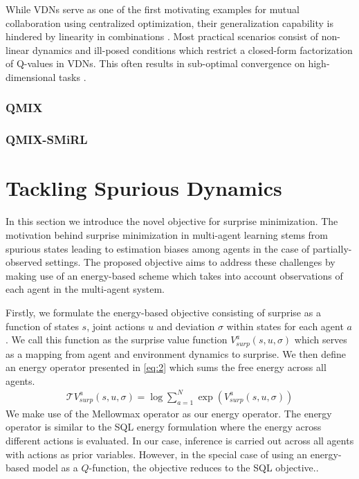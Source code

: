 \documentclass{article}
\begin{document}
\begin{multicols}{2}
While VDNs serve as one of the first motivating examples for mutual collaboration using centralized optimization, their generalization capability is hindered by linearity in combinations \cite{qmix}. Most practical scenarios consist of non-linear dynamics and ill-posed conditions which restrict a closed-form factorization of Q-values in VDNs. This often results in sub-optimal convergence on high-dimensional tasks \cite{qmix}.

\subsubsection{QMIX}

\subsubsection{QMIX-SMiRL}


\section{Tackling Spurious Dynamics}
In this section we introduce the novel objective for surprise minimization. The motivation behind surprise minimization in multi-agent learning stems from spurious states leading to estimation biases among agents in the case of partially-observed settings. The proposed objective aims to address these challenges by making use of an energy-based scheme which takes into account observations of each agent in the multi-agent system. 

Firstly, we formulate the energy-based objective consisting of surprise as a function of states $s$, joint actions $u$ and deviation $\sigma$ within states for each agent $a$. We call this function as the surprise value function $V_{surp}^{a}(s,u,\sigma)$ which serves as a mapping from agent and environment dynamics to surprise. We then define an energy operator presented in \autoref{eq:2} which sums the free energy across all agents. 
\begin{gather}
    \mathcal{T}V^{a}_{surp}(s,u,\sigma) = \log \sum_{a=1}^{N} \exp{(V^{a}_{surp}(s,u,\sigma))} \label{eq:2}
\end{gather}
We make use of the Mellowmax operator \cite{mellowmax} as our energy operator. The energy operator is similar to the SQL energy formulation \cite{sql} where the energy across different actions is evaluated. In our case, inference is carried out across all agents with actions as prior variables. However, in the special case of using an energy-based model as a $Q$-function, the objective reduces to the SQL objective.. 


\end{multicols}
\end{document}
